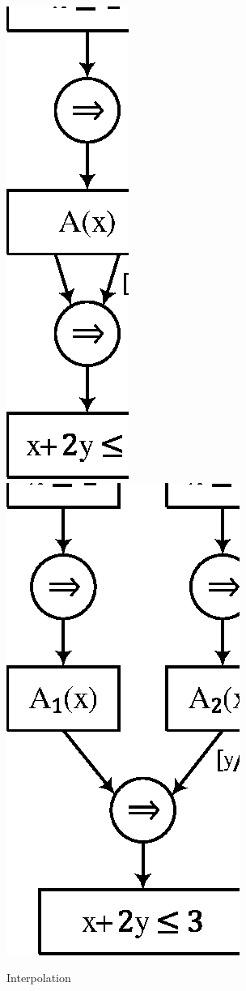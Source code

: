 \begin{figure}
\begin{center}
\includegraphics[scale=1]{figures/ex2-2.eps}
\quad
\includegraphics[scale=1]{figures/ex2-3.eps}
\end{center}
\caption{Interpolation}
\end{figure}

